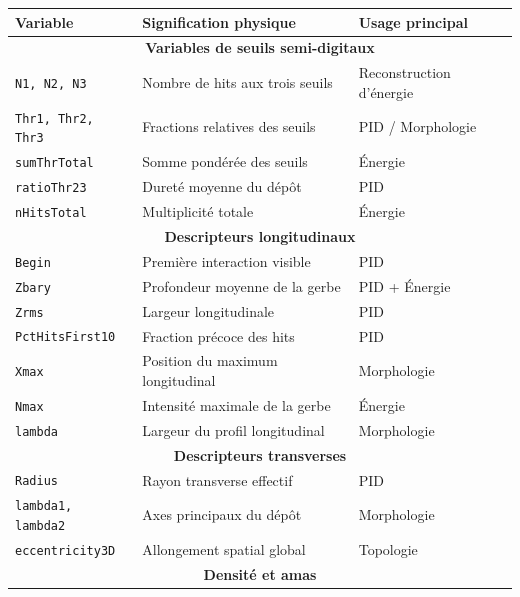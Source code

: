 \begin{table}[!ht]
\centering
\small
\renewcommand{\arraystretch}{1.25}
\setlength{\tabcolsep}{5pt}

\begin{tabular}{|p{4.1cm}|p{5.4cm}|p{3.7cm}|}
\hline
\textbf{Variable} & \textbf{Signification physique} & \textbf{Usage principal} \\
\hline

\multicolumn{3}{|c|}{\textbf{Variables de seuils semi-digitaux}} \\
\hline

\texttt{N1, N2, N3} & Nombre de hits aux trois seuils & Reconstruction d’énergie \\
\texttt{Thr1, Thr2, Thr3} & Fractions relatives des seuils & PID / Morphologie \\
\texttt{sumThrTotal} & Somme pondérée des seuils & Énergie \\
\texttt{ratioThr23} & Dureté moyenne du dépôt & PID \\
\texttt{nHitsTotal} & Multiplicité totale & Énergie \\
\hline

\multicolumn{3}{|c|}{\textbf{Descripteurs longitudinaux}} \\
\hline

\texttt{Begin} & Première interaction visible & PID \\
\texttt{Zbary} & Profondeur moyenne de la gerbe & PID + Énergie \\
\texttt{Zrms} & Largeur longitudinale & PID \\
\texttt{PctHitsFirst10} & Fraction précoce des hits & PID \\
\texttt{Xmax} & Position du maximum longitudinal & Morphologie \\
\texttt{Nmax} & Intensité maximale de la gerbe & Énergie \\
\texttt{lambda} & Largeur du profil longitudinal & Morphologie \\
\hline

\multicolumn{3}{|c|}{\textbf{Descripteurs transverses}} \\
\hline

\texttt{Radius} & Rayon transverse effectif & PID \\
\texttt{lambda1, lambda2} & Axes principaux du dépôt & Morphologie \\
\texttt{eccentricity3D} & Allongement spatial global & Topologie \\
\hline

\multicolumn{3}{|c|}{\textbf{Densité et amas}} \\
\hline


\end{tabular}
\end{table}

